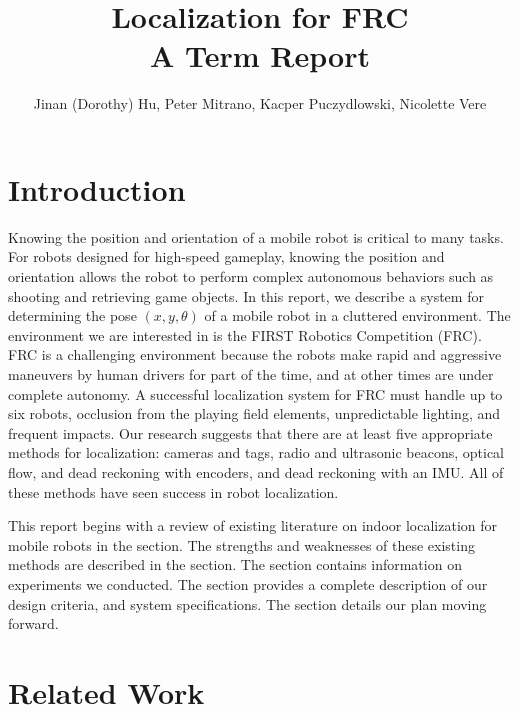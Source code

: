 \documentclass{article}
\begin{document}
\title{Localization for FRC \\
  \large{A Term Report}
  }
\author{Jinan (Dorothy) Hu, Peter Mitrano, Kacper Puczydlowski, Nicolette Vere}

\maketitle{}

\section{Introduction}

Knowing the position and orientation of a mobile robot is critical to many tasks. For robots designed for high-speed gameplay, knowing the position and orientation allows the robot to perform complex autonomous behaviors such as shooting and retrieving game objects. In this report, we describe a system for determining the pose $(x, y, \theta)$ of a mobile robot in a cluttered environment. The environment we are interested in is the FIRST Robotics Competition (FRC). FRC is a challenging environment because the robots make rapid and aggressive maneuvers by human drivers for part of the time, and at other times are under complete autonomy. A successful localization system for FRC must handle up to six robots, occlusion from the playing field elements, unpredictable lighting, and frequent impacts. Our research suggests that there are at least five appropriate methods for localization: cameras and tags, radio and ultrasonic beacons, optical flow, and dead reckoning with encoders, and dead reckoning with an IMU. All of these methods have seen success in robot localization.

This report begins with a review of existing literature on indoor localization for mobile robots in the  section. The strengths and weaknesses of these existing methods are described in the  section. The  section contains information on experiments we conducted. The  section provides a complete description of our design criteria, and system specifications. The  section details our plan moving forward.

\section{Related Work} \label{related_work}
\end{document}

